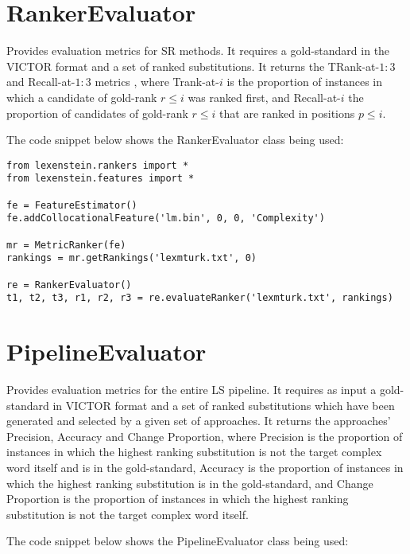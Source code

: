 \section{RankerEvaluator}

Provides evaluation metrics for SR methods. It requires a gold-standard in the VICTOR format and a set of ranked substitutions. It returns the TRank-at-$1:3$ and Recall-at-$1:3$ metrics \cite{semeval}, where Trank-at-$i$ is the proportion of instances in which a candidate of gold-rank $r\leq i$ was ranked first, and Recall-at-$i$ the proportion of candidates of gold-rank $r\leq i$ that are ranked in positions $p\leq i$.

The code snippet below shows the RankerEvaluator class being used:

\begin{lstlisting}
from lexenstein.rankers import *
from lexenstein.features import *

fe = FeatureEstimator()
fe.addCollocationalFeature('lm.bin', 0, 0, 'Complexity')

mr = MetricRanker(fe)
rankings = mr.getRankings('lexmturk.txt', 0)

re = RankerEvaluator()
t1, t2, t3, r1, r2, r3 = re.evaluateRanker('lexmturk.txt', rankings)
\end{lstlisting}












\section{PipelineEvaluator}

Provides evaluation metrics for the entire LS pipeline. It requires as input a gold-standard in VICTOR format and a set of ranked substitutions which have been generated and selected by a given set of approaches. It returns the approaches' Precision, Accuracy and Change Proportion, where Precision is the proportion of instances in which the highest ranking substitution is not the target complex word itself and is in the gold-standard, Accuracy is the proportion of instances in which the highest ranking substitution is in the gold-standard, and Change Proportion is the proportion of instances in which the highest ranking substitution is not the target complex word itself.

The code snippet below shows the PipelineEvaluator class being used:


